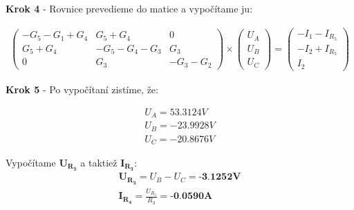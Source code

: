 \begin{center}
    \textbf{Krok 4} - Rovnice prevedieme do matice a vypočítame ju:
\end{center}
\begin{gather*}
    \begin{pmatrix}
        -G_{5} - G_{1} + G_{4} & G_{5} + G_{4} & 0 \\
        G_{5} + G_{4} & -G_{5} - G_{4} - G_{3} & G_{3} \\
        0 & G_{3} & -G_{3} - G_{2}
    \end{pmatrix}
    \times
    \begin{pmatrix}
        U_{A} \\
        U_{B} \\
        U_{C}
    \end{pmatrix}
    =
    \begin{pmatrix}
        -I_1-I_{R_{5}} \\
        -I_2+I_{R_{5}} \\
        I_2
    \end{pmatrix}
\end{gather*}

\begin{center}
    \textbf{Krok 5} - Po vypočítaní zistíme, že:
\end{center}

\begin{gather*}
    U_A = 53.3124V\\
    U_B = -23.9928V \\
    U_C = -20.8676V
\end{gather*}

Vypočítame $\boldsymbol{U_{R_3}}$ a taktiež $\boldsymbol{I_{R_3}}$:
\begin{gather*}
    \boldsymbol{U_{R_3}} = U_B - U_C = \textbf{-3.1252V} \\
    \boldsymbol{I_{R_4}} = \frac{U_{R_3}}{R_3} = \textbf{-0.0590A}
\end{gather*}